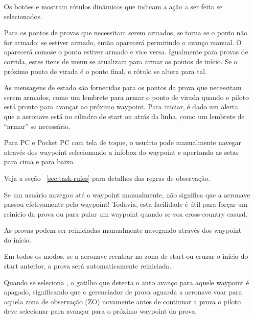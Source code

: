 Os botões  e
 mostram rótulos dinâmicos que indicam a ação a ser feita se selecionados.

Para os pontos de provas que necessitam serem armados,  se torna 
 se o ponto não for armado;  se estiver armado, então aparecerá
 permitindo o avanço manual.  O
 aparecerá comose o ponto estiver armado e vice versa.  Igualmente para provas de corrida, estes itens de menu se atualizam para armar os pontos de início.  Se o próximo ponto de virada é o ponto final, o rótulo se altera para tal.

As mensagens de estado são fornecidas para os pontos da prova que necessitam serem armados, como um lembrete para armar o ponto de virada quando o piloto está pronto para avançar ao próximo waypoint.  Para iniciar, é dado um alerta que a aeronave está no cilindro de start ou atrás da linha, como um lembrete de “armar” se necessário.  

Para PC e Pocket PC com tela de toque, o usuário pode manualmente navegar através dos waypoint selecionando a infobox do waypoint e apertando as setas para cima e para baixo.

Veja a seção ~\ref{sec:task-rules} para detalhes das regras de observação.

Se um usuário navegou até o waypoint manualmente, não significa que a aeronave passou efetivamente pelo waypoint!  Todavia, esta facilidade é útil para forçar um reinicio da prova ou para pular um waypoint quando se voa cross-country casual.

\tip As provas podem ser reiniciadas manualmente navegando através dos waypoint do início.

Em todos os modos, se a aeronave reentrar na zona de start ou cruzar o início do start anterior, a prova será automaticamente reiniciada.

Quando se seleciona  , o gatilho que detecta o auto avanço para aquele waypoint é apagado, significando que o gerenciador de prova aguarda a aeronave voar para aquela zona de observação (ZO) novamente antes de continuar a prova o piloto deve selecionar  para avançar para o próximo waypoint da prova.

